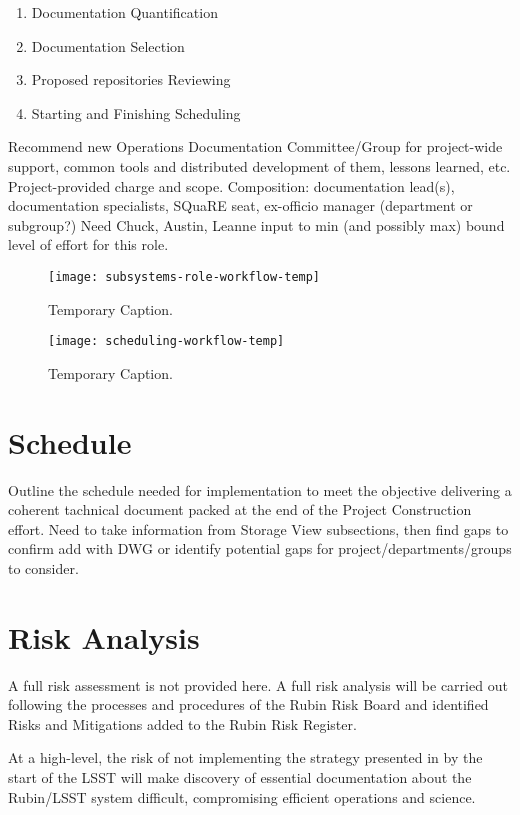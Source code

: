 \begin{enumerate}
        \item Documentation Quantification
        \item Documentation Selection
        \item Proposed repositories Reviewing
        \item Starting and Finishing Scheduling
\end{enumerate}

Recommend new Operations Documentation Committee/Group for project-wide support, common tools and distributed development of them, lessons learned, etc.
Project-provided charge and scope.
Composition: documentation lead(s), documentation specialists, SQuaRE seat, ex-officio manager (department or subgroup?)
Need Chuck, Austin, Leanne input to min (and possibly max) bound level of effort for this role.

\begin{figure}[t]
\caption{Temporary Caption.}
\centering
\texttt{[image: subsystems-role-workflow-temp]}
\label{fig:subsystems-role-workflow}
\end{figure}

\begin{figure}[t]
\caption{Temporary Caption.}
\centering
\texttt{[image: scheduling-workflow-temp]}
\label{fig:scheduling-workflow}
\end{figure}

\section{Schedule}

Outline the schedule needed for implementation to meet the objective delivering a coherent tachnical document packed at the end of the Project Construction effort.
Need to take information from Storage View subsections, then find gaps to confirm add with DWG or identify potential gaps for project/departments/groups to consider.


\section{Risk Analysis}

A full risk assessment is not provided here. 
A full risk analysis will be carried out following the processes and procedures of the Rubin Risk Board  and identified Risks and Mitigations added to the Rubin Risk Register. 

At a high-level, the risk of not implementing the strategy presented in  by the start of the LSST will make discovery of essential documentation about the Rubin/LSST system difficult, compromising efficient operations and science. 


